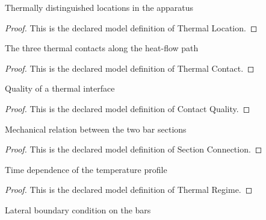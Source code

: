 \begin{definition}
  \label{def:physics:phyx-mini-0467:phyxminiproblems-problemphyxmini0467-thermallocation}
  Thermally distinguished locations in the apparatus
\end{definition}
\begin{proof}
  This is the declared model definition of Thermal Location.
\end{proof}
\begin{definition}
  \label{def:physics:phyx-mini-0467:phyxminiproblems-problemphyxmini0467-thermalcontact}
  The three thermal contacts along the heat-flow path
\end{definition}
\begin{proof}
  This is the declared model definition of Thermal Contact.
\end{proof}
\begin{definition}
  \label{def:physics:phyx-mini-0467:phyxminiproblems-problemphyxmini0467-contactquality}
  Quality of a thermal interface
\end{definition}
\begin{proof}
  This is the declared model definition of Contact Quality.
\end{proof}
\begin{definition}
  \label{def:physics:phyx-mini-0467:phyxminiproblems-problemphyxmini0467-sectionconnection}
  Mechanical relation between the two bar sections
\end{definition}
\begin{proof}
  This is the declared model definition of Section Connection.
\end{proof}
\begin{definition}
  \label{def:physics:phyx-mini-0467:phyxminiproblems-problemphyxmini0467-thermalregime}
  Time dependence of the temperature profile
\end{definition}
\begin{proof}
  This is the declared model definition of Thermal Regime.
\end{proof}
\begin{definition}
  \label{def:physics:phyx-mini-0467:phyxminiproblems-problemphyxmini0467-barsidecondition}
  Lateral boundary condition on the bars
\end{definition}
